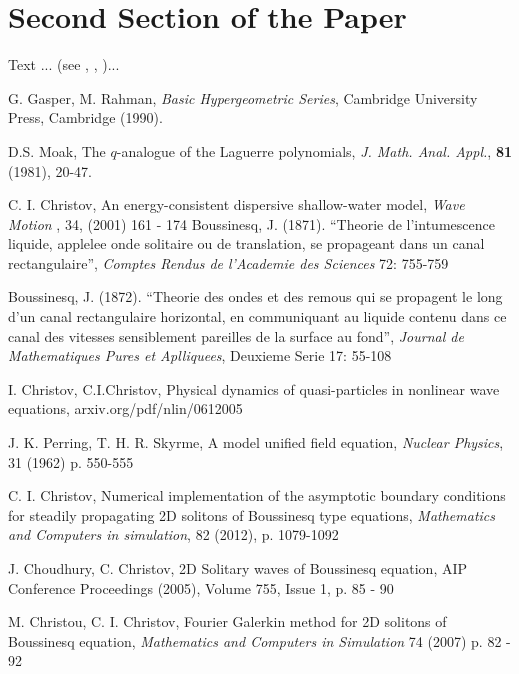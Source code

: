 \documentclass[12pt]{article}
\theoremstyle{theorem}
\theoremstyle{defi}
\begin{document}
\section{Second Section of the Paper}

Text ... (see \cite{gasrah}, \cite{rosbl}, \cite{Moak})...

\begin{thebibliography}{99}

 G. Gasper, M. Rahman,
{\it Basic Hypergeometric Series}, Cambridge University Press, Cambridge (1990).

 D.S. Moak,
The $q$-analogue of the Laguerre polynomials, {\it J. Math. Anal. Appl.}, {\bf 81} (1981), 20-47.

 C. I. Christov, An energy-consistent dispersive shallow-water model,  {\it Wave Motion }, 34, (2001) 161 - 174
 Boussinesq, J. (1871). “Theorie de l’intumescence liquide, applelee onde solitaire ou de translation, se propageant dans un canal rectangulaire”,  {\it Comptes Rendus de l’Academie des Sciences } 72: 755-759

 Boussinesq, J. (1872). “Theorie des ondes et des remous qui se propagent le long d’un canal rectangulaire horizontal, en communiquant au liquide contenu dans ce canal des vitesses sensiblement pareilles de la surface au fond”, {\it Journal de Mathematiques Pures et Aplliquees}, Deuxieme Serie 17: 55-108

 I. Christov, C.I.Christov, Physical dynamics of quasi-particles in nonlinear wave equations, arxiv.org/pdf/nlin/0612005

 J. K. Perring, T. H. R. Skyrme, A model unified field equation, {\it Nuclear Physics},  31 (1962) p. 550-555 

  C. I. Christov, Numerical implementation of the asymptotic boundary conditions for steadily propagating 2D solitons of Boussinesq type equations, {\it Mathematics and Computers in simulation}, 82 (2012), p. 1079-1092

  J. Choudhury, C. Christov, 2D Solitary waves of Boussinesq equation, AIP Conference Proceedings (2005), Volume 755, Issue 1, p. 85 - 90

  M. Christou, C. I. Christov, Fourier Galerkin method for 2D solitons of Boussinesq equation,  {\it Mathematics and Computers in Simulation} 74 (2007) p. 82 - 92


\end{thebibliography}
\end{document}
